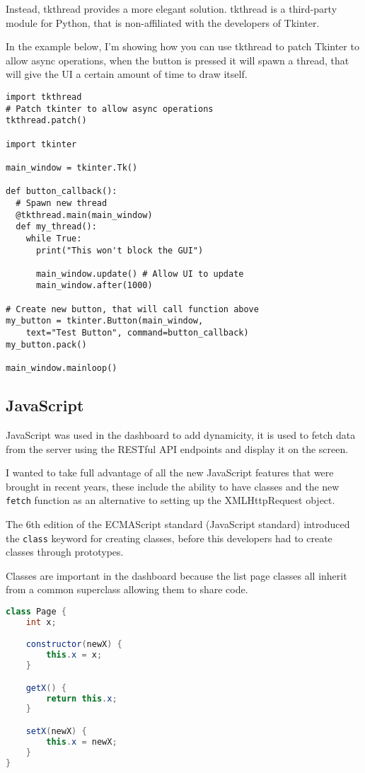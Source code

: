 Instead, tkthread provides a more elegant solution.
tkthread is a third-party module for Python,
that is non-affiliated with the developers of Tkinter.

In the example below, I'm showing how you can use tkthread to patch
Tkinter to allow async operations,
when the button is pressed it will spawn a thread,
that will give the UI a certain amount of time to draw itself.

\begin{lstlisting}
import tkthread
# Patch tkinter to allow async operations
tkthread.patch()

import tkinter

main_window = tkinter.Tk()

def button_callback():
  # Spawn new thread
  @tkthread.main(main_window)
  def my_thread():
    while True:
      print("This won't block the GUI")
      
      main_window.update() # Allow UI to update
      main_window.after(1000)

# Create new button, that will call function above
my_button = tkinter.Button(main_window,
    text="Test Button", command=button_callback)
my_button.pack()

main_window.mainloop()
\end{lstlisting}

\subsection{JavaScript}
JavaScript was used in the dashboard to add dynamicity,
it is used to fetch data from the server using the RESTful API endpoints
and display it on the screen.

I wanted to take full advantage of all the new JavaScript features that were brought in
recent years, these include the ability to have classes and
the new \texttt{fetch} function as an alternative to setting up the XMLHttpRequest object.

The 6th edition of the ECMAScript standard \cite{ES6} (JavaScript standard) 
introduced the \texttt{class} keyword for creating classes,
before this developers had to create classes through prototypes.

Classes are important in the dashboard because the list page classes
all inherit from a common superclass allowing them to share code.

\begin{lstlisting}[language=Java]
class Page {
    int x;

    constructor(newX) {
        this.x = x;
    }

    getX() {
        return this.x;
    }

    setX(newX) {
        this.x = newX;
    }
}
\end{lstlisting}

